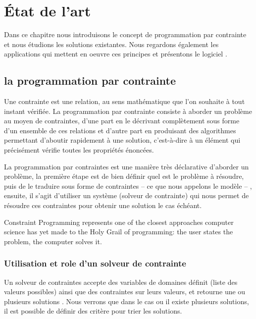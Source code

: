 \chapter{État de l'art}
Dans ce chapitre nous introduisons le concept de programmation par contrainte et nous étudions les solutions existantes. Nous regardons également les applications qui mettent en oeuvre ces principes et présentons le logiciel \iscore{}.
\section{la programmation par contrainte}
\begin{citeauteur}
Une contrainte est une relation, au sens mathématique que l’on souhaite à tout instant vérifiée. La programmation par contrainte consiste à aborder un problème au moyen de contraintes, d’une part en le décrivant complètement sous forme d’un ensemble de ces relations et d’autre part en produisant des algorithmes permettant d’aboutir rapidement à une solution, c'est-à-dire à un élément qui précisément vérifie toutes les propriétés énoncées.
\end{citeauteur}

La programmation par contraintes est une manière très déclarative d'aborder un problème, la première étape est de bien définir quel est le problème à résoudre, puis de le traduire sous forme de contraintes -- ce que nous appelons le modèle -- , ensuite, il s'agit d'utiliser un système (solveur de contrainte) qui nous permet de résoudre ces contraintes pour obtenir une solution le cas échéant.

\begin{citeauteur}
Constraint Programming represents one of the closest approaches computer science has yet made to the Holy Grail of programming: the user states the problem, the computer solves it.
\end{citeauteur}

\subsection{Utilisation et role d'un solveur de contrainte}

Un solveur de contraintes accepte des variables de domaines définit (liste des valeurs possibles) ainsi que des contraintes sur leurs valeurs, et retourne une ou plusieurs solutions . Nous verrons que dans le cas ou il existe plusieurs solutions, il est possible de définir des critère pour trier les solutions.

